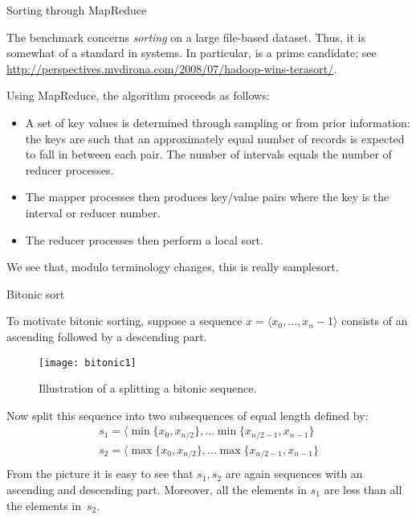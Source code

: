 
 {Sorting through MapReduce}
\label{sec:terasort}

The  benchmark concerns
%
\emph{sorting} on a large
file-based dataset. Thus, it is somewhat of a standard in
 systems. In particular, 
 is a prime candidate; see
\url{http://perspectives.mvdirona.com/2008/07/hadoop-wins-terasort/}.

Using MapReduce, the algorithm proceeds as follows:
\begin{itemize}
\item A set of key values is determined through sampling or from prior
  information: the keys are such that an approximately equal number of
  records is expected to fall in between each pair. The number of
  intervals equals the number of reducer processes.
\item The mapper processes then produces key/value pairs where the key
  is the interval or reducer number.
\item The reducer processes then perform a local sort.
\end{itemize}

We see that, modulo terminology changes, this is really samplesort.

 {Bitonic sort}
\label{app:bitonicsort}

To motivate bitonic sorting,
suppose a sequence $x=\langle x_0,\ldots,x_n-1\rangle$
consists of an ascending
followed by a descending part.
\begin{figure}[ht]
\texttt{[image: bitonic1]}
\caption{Illustration of a splitting a bitonic sequence.}
\end{figure}
Now split this sequence into two subsequences of equal length
defined by:
\begin{equation}
\begin{array}{cc}
s_1 = \langle \min\{x_0,x_{n/2}\},\ldots \min\{ x_{n/2-1},x_{n-1}\}\\
s_2 = \langle \max\{x_0,x_{n/2}\},\ldots \max\{ x_{n/2-1},x_{n-1}\}\\
\end{array}
\label{eq:bitonic-split}
\end{equation}
From the picture it is easy to see that $s_1,s_2$ are again 
sequences with an ascending and descending part. Moreover,
all the elements in $s_1$ are less than all the elements in~$s_2$.

